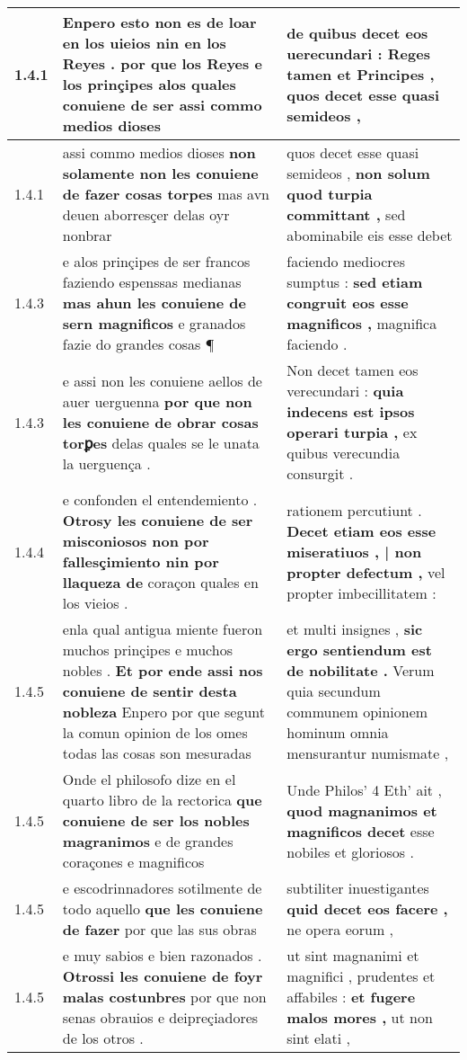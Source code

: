 \begin{tabular}{|p{1cm}|p{6.5cm}|p{6.5cm}|}
1.4.1 & Enpero esto non es de loar en los uieios nin en los Reyes . \textbf{ por que los Reyes e los prinçipes alos quales conuiene de ser } assi commo medios dioses & de quibus decet eos uerecundari : \textbf{ Reges tamen et Principes , } quos decet esse quasi semideos , \\\hline
1.4.1 & assi commo medios dioses \textbf{ non solamente non les conuiene de fazer cosas torpes } mas avn deuen aborresçer delas oyr nonbrar & quos decet esse quasi semideos , \textbf{ non solum quod turpia committant , } sed abominabile eis esse debet \\\hline
1.4.3 & e alos prinçipes de ser francos faziendo espenssas medianas \textbf{ mas ahun les conuiene de sern magnificos } e granados fazie do grandes cosas ¶ & faciendo mediocres sumptus : \textbf{ sed etiam congruit eos esse magnificos , } magnifica faciendo . \\\hline
1.4.3 & e assi non les conuiene aellos de auer uerguenna \textbf{ por que non les conuiene de obrar cosas torꝑes } delas quales se le unata la uerguença . & Non decet tamen eos verecundari : \textbf{ quia indecens est ipsos operari turpia , } ex quibus verecundia consurgit . \\\hline
1.4.4 & e confonden el entendemiento . \textbf{ Otrosy les conuiene de ser misconiosos non por fallesçimiento nin por llaqueza de } coraçon quales en los vieios . & rationem percutiunt . \textbf{ Decet etiam eos esse miseratiuos , | non propter defectum , } vel propter imbecillitatem : \\\hline
1.4.5 & enla qual antigua miente fueron muchos prinçipes e muchos nobles . \textbf{ Et por ende assi nos conuiene de sentir desta nobleza } Enpero por que segunt la comun opinion de los omes todas las cosas son mesuradas & et multi insignes , \textbf{ sic ergo sentiendum est de nobilitate . } Verum quia secundum communem opinionem hominum omnia mensurantur numismate , \\\hline
1.4.5 & Onde el philosofo dize en el quarto libro de la rectorica \textbf{ que conuiene de ser los nobles magranimos } e de grandes coraçones e magnificos & Unde Philos’ 4 Eth’ ait , \textbf{ quod magnanimos et magnificos decet } esse nobiles et gloriosos . \\\hline
1.4.5 & e escodrinnadores sotilmente de todo aquello \textbf{ que les conuiene de fazer } por que las sus obras & subtiliter inuestigantes \textbf{ quid decet eos facere , } ne opera eorum , \\\hline
1.4.5 & e muy sabios e bien razonados . \textbf{ Otrossi les conuiene de foyr malas costunbres } por que non senas obrauios e deipreçiadores de los otros . & ut sint magnanimi et magnifici , prudentes et affabiles : \textbf{ et fugere malos mores , } ut non sint elati , \\\hline

\end{tabular}
